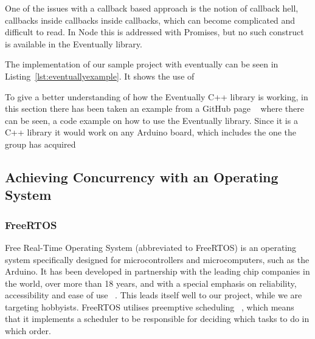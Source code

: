 One of the issues with a callback based approach is the notion of callback hell, callbacks inside callbacks inside callbacks, which can become complicated and difficult to read. In Node this is addressed with Promises, but no such construct is available in the Eventually library.

The implementation of our sample project with eventually can be seen in Listing~\ref{lst:eventuallyexample}. It shows the use of 



To give a better understanding of how the Eventually C++ library is working, in this section there has been taken an example from a GitHub page ~\cite{bartlettEventually2022Bartlett} where there can be seen, a code example on how to use the Eventually library. Since it is a C++ library it would work on any Arduino board, which includes the one the group has acquired ~\cite{bartlettEventually2022Bartlett}





\subsection{Achieving Concurrency with an Operating System}\label{subsec:arduinoos}



\subsubsection{FreeRTOS}
Free Real-Time Operating System (abbreviated to FreeRTOS) is an operating system specifically designed for microcontrollers and microcomputers, such as the Arduino. It has been developed in partnership with the leading chip companies in the world, over more than 18 years, and with a special emphasis on reliability, accessibility and ease of use ~\cite{AboutRTOS}. This leads itself well to our project, while we are targeting hobbyists. FreeRTOS utilises preemptive scheduling ~\cite{SchedulingRTOS}, which means that it implements a scheduler to be responsible for deciding which tasks to do in which order.



